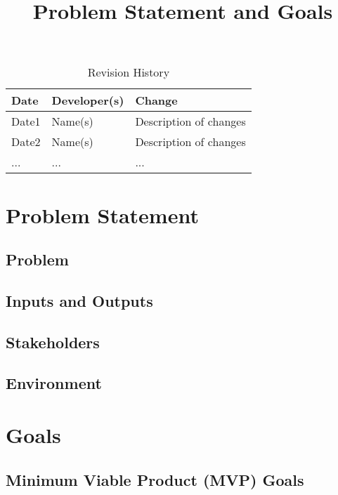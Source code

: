 \documentclass{article}
\title{Problem Statement and Goals\\\progname}
\author{\authname}
\date{}
\begin{document}
    \maketitle

    \begin{table}[hp]
        \caption{Revision History} \label{TblRevisionHistory}
        \begin{tabularx}{\textwidth}{llX}
            \toprule
            \textbf{Date} & \textbf{Developer(s)} & \textbf{Change}\\
            \midrule
            Date1 & Name(s) & Description of changes\\
            Date2 & Name(s) & Description of changes\\
            ... & ... & ...\\
            \bottomrule
        \end{tabularx}
    \end{table}

    \section{Problem Statement}

    \subsection{Problem}


    \subsection{Inputs and Outputs}


    \subsection{Stakeholders}


    \subsection{Environment}

    \section{Goals}

    \subsection{Minimum Viable Product (MVP) Goals}
\end{document}
